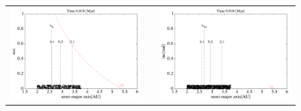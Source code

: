 \documentclass[11pt,a4paper,oneside,onecolumn]{jreport}
\begin{document}
\begin{figure}[H]
\begin{tabular}{ccc}
\begin{minipage}[t]{0.45\hsize}
\centering
\includegraphics[width=8cm]{./image/asteroid_ecc_10kyr.pdf}
\end{minipage} &
\begin{minipage}[t]{0.1\hsize}
\end{minipage} &
\begin{minipage}[t]{0.45\hsize}
\centering
\includegraphics[width=8cm]{./image/asteroid_inc_10kyr.pdf}
\end{minipage}\\
%
\end{tabular}
\caption{\label{fig:asteroid_ecc_inc_10kyr}}
\end{figure}
\end{document}
